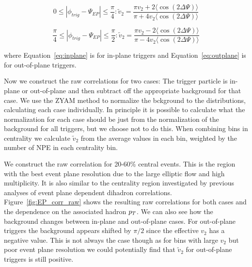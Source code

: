 \begin{equation}\label{eq:inplane}
0 \leq |\phi_{trig} - \Psi_{EP}| \leq \frac{\pi}{4} : 
	  \widetilde{v}_{2} = \frac{\pi v_{2} + 2 \langle\cos(2\Delta\Psi)\rangle}
						{\pi + 4 v_{2}  \langle\cos(2\Delta\Psi)\rangle}
\end{equation}

\begin{equation}\label{eq:outplane}
\frac{\pi}{4} \leq |\phi_{trig} - \Psi_{EP}| \leq \frac{\pi}{2} : 
           \widetilde{v}_{2} = \frac{\pi v_{2} - 2 \langle\cos(2\Delta\Psi)\rangle}
						{\pi - 4 v_{2}  \langle\cos(2\Delta\Psi)\rangle}
\end{equation}

where Equation~\ref{eq:inplane} is for in-plane triggers and Equation~\ref{eq:outplane} is for out-of-plane triggers.

Now we construct the raw correlations for two cases: The trigger particle is in-plane or out-of-plane and then subtract off the appropriate background for that case. We use the ZYAM method to normalize the bckground to the distributions, calculating each case individually. In principle it is possible to calculate what the normalization for each case should be just from the normalization of the background for all triggers, but we choose not to do this. When combining bins in centrality we calculate $\widetilde{v}_{2}$ from the average values in each bin, weighted by the number of NPE in each centrality bin.

We construct the raw correlation for 20-60\% central events. This is the region with the best event plane resolution due to the large elliptic flow and high multiplicity. It is also similar to the centrality region investigated by previous analyses of event plane dependent dihadron correlations. Figure~\ref{fig:EP_corr_raw} shows the resulting raw correlations for both cases and the dependence on the associated hadron $p_{T}$. We can also see how the background changes between in-plane and out-of-plane cases. For out-of-plane triggers the background appears shifted by $\pi/2$ since the effective $v_2$ has a negative value. This is not always the case though as for bins with large $v_2$ but poor event plane resolution we could potentially find that $\widetilde{v}_{2}$ for out-of-plane triggers is still positive.

